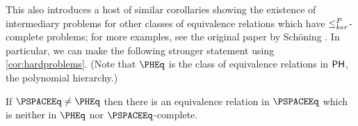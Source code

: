 This also introduces a host of similar corollaries showing the existence of intermediary problems for other classes of equivalence relations which have $\leq^{P}_{ker}$-complete problems; for more examples, see the original paper by Schöning \autocite{schoning82}.
In particular, we can make the following stronger statement using \autoref{cor:hardproblems}.
(Note that $\PHEq$ is the class of equivalence relations in ${\mathsf{PH}}$, the polynomial hierarchy.)
\begin{corollary}\label{cor:pspace}
  If $\PSPACEEq \neq \PHEq$ then there is an equivalence relation in $\PSPACEEq$ which is neither in $\PHEq$ nor $\PSPACEEq$-complete.
\end{corollary}
